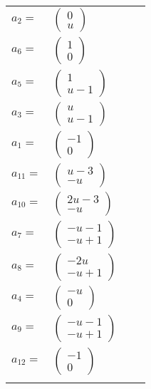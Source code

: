 \documentclass[1p]{elsarticle_modified}
\theoremstyle{definition}
\begin{document}
\begin{tabular}{m{7pt} m{180pt} m{7pt} m{180pt} }
\flushright $a_{2}=$&$\begin{pmatrix}0\\u\end{pmatrix}$ \\
\flushright $a_{6}=$&$\begin{pmatrix}1\\0\end{pmatrix}$ \\
\flushright $a_{5}=$&$\begin{pmatrix}1\\u-1\end{pmatrix}$ \\
\flushright $a_{3}=$&$\begin{pmatrix}u\\u-1\end{pmatrix}$ \\
\flushright $a_{1}=$&$\begin{pmatrix}-1\\0\end{pmatrix}$ \\
\flushright $a_{11}=$&$\begin{pmatrix}u-3\\- u\end{pmatrix}$ \\
\flushright $a_{10}=$&$\begin{pmatrix}2 u-3\\- u\end{pmatrix}$ \\
\flushright $a_{7}=$&$\begin{pmatrix}- u-1\\- u+1\end{pmatrix}$ \\
\flushright $a_{8}=$&$\begin{pmatrix}-2 u\\- u+1\end{pmatrix}$ \\
\flushright $a_{4}=$&$\begin{pmatrix}- u\\0\end{pmatrix}$ \\
\flushright $a_{9}=$&$\begin{pmatrix}- u-1\\- u+1\end{pmatrix}$ \\
\flushright $a_{12}=$&$\begin{pmatrix}-1\\0\end{pmatrix}$\\&\end{tabular}
\end{document}
